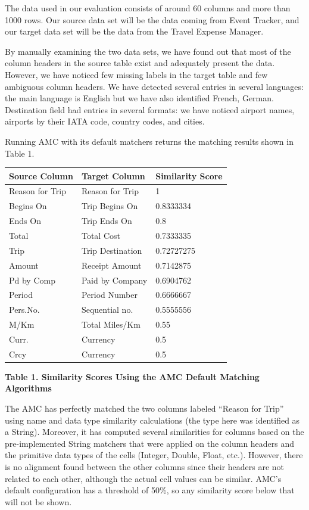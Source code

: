 \documentclass{sig-alternate}
\begin{document}
The data used in our evaluation consists of around 60 columns and more than 1000 rows. Our source data set will be the data coming from Event Tracker, and our target data set will be the data from the Travel Expense Manager.

By manually examining the two data sets, we have found out that most of the column headers in the source table exist and adequately present the data. However, we have noticed few missing labels in the target table and few ambiguous column headers. We have detected several entries in several languages: the main language is English but we have also identified French, German. Destination field had entries in several formats: we have noticed airport names, airports by their IATA code, country codes, and cities.

Running AMC with its default matchers returns the matching results shown in Table 1.



\begin{tabular}{|p{0.7in}|p{0.8in}|p{0.8in}|} \hline
\textbf{Source Column} & \textbf{Target Column} & \textbf{Similarity Score} \\ \hline
Reason for Trip & Reason for Trip & 1 \\ \hline
Begins On & Trip Begins On & 0.8333334 \\ \hline
Ends On & Trip Ends On & 0.8 \\ \hline
Total & Total Cost & 0.7333335 \\ \hline
Trip & Trip Destination & 0.72727275 \\ \hline
Amount & Receipt Amount & 0.7142875 \\ \hline
Pd by Comp & Paid by Company & 0.6904762 \\ \hline
Period & Period Number & 0.6666667 \\ \hline
Pers.No. & Sequential no. & 0.5555556 \\ \hline
M/Km & Total Miles/Km & 0.55 \\ \hline
Curr. & Currency & 0.5 \\ \hline
Crcy & Currency & 0.5 \\ \hline
\end{tabular}



\textbf{Table 1. Similarity Scores Using the AMC Default Matching Algorithms}

The AMC has perfectly matched the two columns labeled ``Reason for Trip'' using name and data type similarity calculations (the type here was identified as a String). Moreover, it has computed several similarities for columns based on the pre-implemented String matchers that were applied on the column headers and the primitive data types of the cells (Integer, Double, Float, etc.). However, there is no alignment found between the other columns since their headers are not related to each other, although the actual cell values can be similar. AMC's default configuration has a threshold of 50\%, so any similarity score below that will not be shown.
\end{document}
